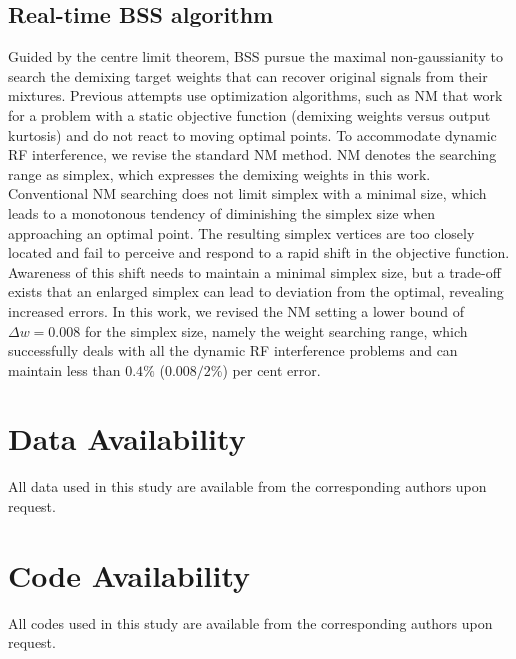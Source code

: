 \documentclass[pdflatex,mathphys]{sty}%
\begin{document}
\subsection{Real-time BSS algorithm}
Guided by the centre limit theorem, BSS pursue the maximal non-gaussianity to search the demixing target weights that can recover original signals from their mixtures. Previous attempts \cite{zhang2022broadband,ma2020blind} use optimization algorithms, such as NM \cite{nelder1965simplex} that work for a problem with a static objective function (demixing weights versus output kurtosis) and do not react to moving optimal points. To accommodate dynamic RF interference, we revise the standard NM method. NM denotes the searching range as simplex, which expresses the demixing weights in this work. Conventional NM searching does not limit simplex with a minimal size, which leads to a monotonous tendency of diminishing the simplex size when approaching an optimal point. The resulting simplex vertices are too closely located and fail to perceive and respond to a rapid shift in the objective function. Awareness of this shift needs to maintain a minimal simplex size, but a trade-off exists that an enlarged simplex can lead to deviation from the optimal, revealing increased errors. In this work, we revised the NM setting a lower bound of $\Delta w = 0.008$ for the simplex size, namely the weight searching range, which successfully deals with all the dynamic RF interference problems and can maintain less than $0.4\%$ ($0.008/2\%$) per cent error.

\section{Data Availability}
All data used in this study are available from the corresponding authors upon request.

\section{Code Availability}
All codes used in this study are available from the corresponding authors upon request.

\backmatter



\end{document}
